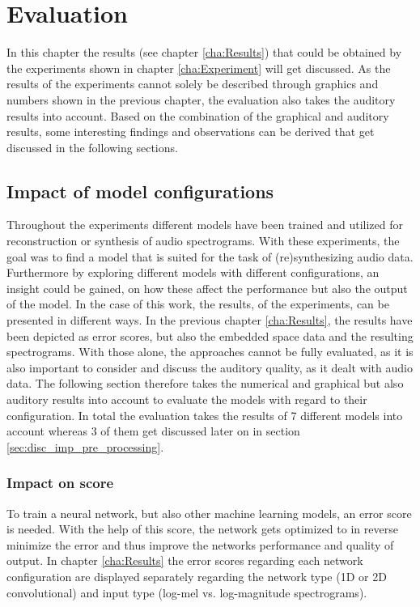 \chapter{Evaluation}
\label{cha:Discussion}

In this chapter the results (see chapter \ref{cha:Results}) that could be obtained by the experiments shown in chapter \ref{cha:Experiment} will get discussed. As the results of the experiments cannot solely be described through graphics and numbers shown in the previous chapter, the evaluation also takes the auditory results into account. Based on the combination of the graphical and auditory results, some interesting findings and observations can be derived that get discussed in the following sections.


\section{Impact of model configurations}
\label{sec:disc_model_conf}
Throughout the experiments different models have been trained and utilized for reconstruction or synthesis of audio spectrograms. With these experiments, the goal was to find a model that is suited for the task of (re)synthesizing audio data. Furthermore by exploring different models with different configurations, an insight could be gained, on how these affect the performance but also the output of the model. In the case of this work, the results, of the experiments, can be presented in different ways. In the previous chapter \ref{cha:Results}, the results have been depicted as error scores, but also the embedded space data and the resulting spectrograms. With those alone, the approaches cannot be fully evaluated, as it is also important to consider and discuss the auditory quality, as it dealt with audio data. The following section therefore takes the numerical and graphical but also auditory results into account to evaluate the models with regard to their configuration. In total the evaluation takes the results of 7 different models into account whereas 3 of them get discussed later on in section \ref{sec:disc_imp_pre_processing}.

\subsection{Impact on score}
\label{subsec:disc_conf_score}
To train a neural network, but also other machine learning models, an error score is needed. With the help of this score, the network gets optimized to in reverse minimize the error and thus improve the networks performance and quality of output. In chapter \ref{cha:Results} the error scores regarding each network configuration are displayed separately regarding the network type (1D or 2D convolutional) and input type (log-mel vs. log-magnitude spectrograms).

